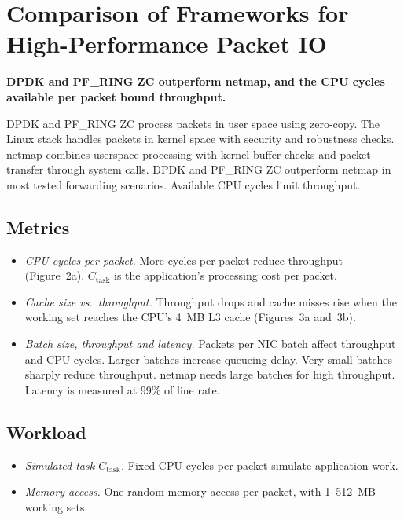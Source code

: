 \documentclass[11pt,a4paper]{article}
\newcommand{\finding}[1]{\textbf{#1}\par\smallskip}
\begin{document}
\section*{\large\normalfont Comparison of Frameworks for High-Performance Packet IO~\cite{gallenmueller2015}}
\finding{DPDK and PF\_RING ZC outperform netmap, and the CPU cycles available per packet bound throughput.}
DPDK and PF\_RING ZC process packets in user space using zero-copy.
The Linux stack handles packets in kernel space with security and robustness checks.
netmap combines userspace processing with kernel buffer checks and packet transfer through system calls.
DPDK and PF\_RING ZC outperform netmap in most tested forwarding scenarios.
Available CPU cycles limit throughput.

\subsection*{\normalsize\normalfont Metrics}
\begin{itemize}
\setlength{\itemsep}{2pt}
\item \emph{CPU cycles per packet.}
More cycles per packet reduce throughput (Figure~2a).
$C_{\mathrm{task}}$ is the application's processing cost per packet.

\item \emph{Cache size vs.\ throughput.}
Throughput drops and cache misses rise when the working set reaches the CPU's 4~MB L3 cache (Figures~3a and~3b).

\item \emph{Batch size, throughput and latency.}
Packets per NIC batch affect throughput and CPU cycles.
Larger batches increase queueing delay.
Very small batches sharply reduce throughput.
netmap needs large batches for high throughput.
Latency is measured at 99\% of line rate.
\end{itemize}

\subsection*{\normalsize\normalfont Workload}
\begin{itemize}
\setlength{\itemsep}{2pt}
\item \emph{Simulated task $C_{\mathrm{task}}$.}
Fixed CPU cycles per packet simulate application work.
\item \emph{Memory access.}
One random memory access per packet, with 1--512~MB working sets.
\end{itemize}
\end{document}
